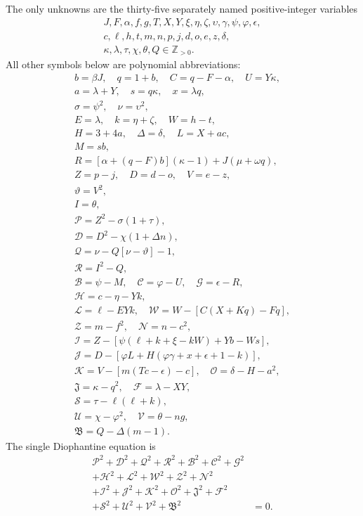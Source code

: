 The only unknowns are the thirty-five separately named positive-integer variables
\[
\begin{gathered}J,F,\alpha,f,g,T,X,Y,\xi,\eta,\zeta,\upsilon,\gamma,\psi,\varphi,\epsilon,\\
c,\ell,h,t,m,n,p,j,d,o,e,z,\delta,\\
\kappa,\lambda,\tau,\chi,\theta,Q\in\mathbb Z_{>0}.\end{gathered}
\]
All other symbols below are polynomial abbreviations:
\[
\begin{gathered}
b=\beta J,\quad q=1+b,\quad C=q-F-\alpha,\quad U=Y\kappa,\\
a=\lambda+Y,\quad s=q\kappa,\quad x=\lambda q,\\
\sigma=\psi^2,\quad\nu=\upsilon^2,\\
E=\lambda,\quad k=\eta+\zeta,\quad W=h-t,\\
H=3+4a,\quad\Delta=\delta,\quad L=X+ac,\\
M=sb,\\
R=[\alpha+(q-F)b](\kappa-1)+J(\mu+\omega q),\\
Z=p-j,\quad D=d-o,\quad V=e-z,\\
\vartheta=V^2,\\
I=\theta,\\
\mathcal{P}=Z^2-\sigma(1+\tau),\\
\mathcal{D}=D^2-\chi(1+\Delta n),\\
\mathcal{Q}=\nu-Q[\nu-\vartheta]-1,\\
\mathcal{R}=I^2-Q,\\
\mathcal{B}=\psi-M,\quad \mathcal{C}=\varphi-U,\quad \mathcal{G}=\epsilon-R,\\
\mathcal{H}=c-\eta-Yk,\\
\mathcal{L}=\ell-EYk,\quad \mathcal{W}=W-[C(X+Kq)-Fq],\\
\mathcal{Z}=m-f^2,\quad \mathcal{N}=n-c^2,\\
\mathcal{I}=Z-[\psi(\ell+k+\xi-kW)+Yb-Ws],\\
\mathcal{J}=D-[\varphi L+H(\varphi\gamma+x+\epsilon+1-k)],\\
\mathcal{K}=V-[m(Tc-\epsilon)-c],\quad\mathcal{O}=\delta-H-a^2,\\
\mathfrak{J}=\kappa-q^2,\quad\mathcal{F}=\lambda-XY,\\
\mathcal{S}=\tau-\ell(\ell+k),\\
\mathcal{U}=\chi-\varphi^2,\quad\mathcal{V}=\theta-ng,\\
\mathfrak{B}=Q-\Delta(m-1).
\end{gathered}
\]
The single Diophantine equation is
\[
\begin{split}
\mathcal{P}^2+\mathcal{D}^2+\mathcal{Q}^2+\mathcal{R}^2+\mathcal{B}^2+\mathcal{C}^2+\mathcal{G}^2 &\\
+\mathcal{H}^2+\mathcal{L}^2+\mathcal{W}^2+\mathcal{Z}^2+\mathcal{N}^2 &\\
+\mathcal{I}^2+\mathcal{J}^2+\mathcal{K}^2+\mathcal{O}^2+\mathfrak{J}^2+\mathcal{F}^2 &\\
+\mathcal{S}^2+\mathcal{U}^2+\mathcal{V}^2+\mathfrak{B}^2 &= 0.
\end{split}
\]
